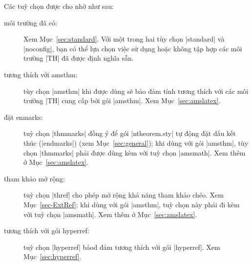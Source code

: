 \documentclass[11pt,oneside]{ltxdoc}
\theoremstyle{marginbreak}
\theoremstyle{changebreak}
\theoremstyle{change}
\theoremstyle{plain}
\theoremstyle{nonumberplain}
\begin{document}
\medskip
Các tuỳ chọn được cho nhờ  như sau: %
\begin{description}
\item[môi trường đã có:] Xem Mục~\vref{sec:standard}. Với một
	trong hai tùy chọn |standard| và |noconfig|,
	bạn có thể lựa chọn việc sử dụng hoặc không tập hợp
	các môi trường |TH| đã được định nghĩa sẵn.
\item[tương thích với amsthm:]
	tùy chọn |amsthm| khi được dùng sẽ bảo đảm tính tương thích với các môi trường
	|TH| cung cấp bởi gói |amsthm|. Xem Mục~\vref{sec:amslatex}.
\item[đặt enmarks:]
	tuỳ chọn |thmmarks| đồng ý để gói |ntheorem.sty| tự động đặt dấu kết thúc
	(|endmarks|) (xem Mục~\ref{sec:general}); khi dùng với gói |amsthm|,
	tùy chọn |thmmarks| phải được dùng kèm với tuỳ chọn |amsmath|.
	Xem thêm ở Mục~\ref{sec:amslatex}.
\item[tham khảo mở rộng:]
	tuỳ chọn |thref| cho phép mở rộng khả năng tham khảo chéo. Xem Mục~\vref{sec-ExtRef};
	khi dùng với gói |amsthm|, tuỳ chọn này phải đi kèm với tuỳ chọn |amsmath|.
	Xem thêm ở Mục~\ref{sec:amslatex}.
\item[tương thích với gói hyperref:]
	tuỳ chọn |hyperref| bảod đảm tương thích với gói |hyperref|.
	Xem Mục~\vref{sec:hyperref}.
\end{description}
\end{document}

